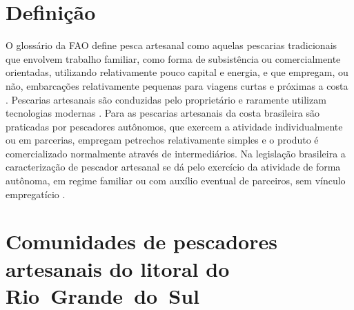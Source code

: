 \documentclass[a4paper,11pt,twoside,showtrims,onecolumn,openright,final]{memoir}
\begin{document}

\newpage

\section*{Definição}

O glossário da FAO define pesca artesanal como aquelas pescarias tradicionais que envolvem 
trabalho familiar, como forma de subsistência ou comercialmente orientadas, utilizando 
relativamente pouco capital e energia, e que empregam, ou não, embarcações relativamente 
pequenas para viagens curtas e próximas a costa \citep{fao2005}. Pescarias artesanais são conduzidas 
pelo proprietário e raramente utilizam tecnologias modernas \citep{panayotou1982}. 
Para \citet{diegues1983,diegues1988} as pescarias artesanais da costa 
brasileira são praticadas por pescadores autônomos, que exercem a atividade 
individualmente ou em parcerias, empregam petrechos relativamente simples e o produto 
é comercializado normalmente através de intermediários. Na legislação brasileira a 
caracterização de pescador artesanal se dá pelo exercício da atividade de forma autônoma, 
em regime familiar ou com auxílio eventual de parceiros, 
sem vínculo empregatício \citep{brasil2003,seap2004}.


\section*{Comunidades de pescadores artesanais do litoral do \mbox{Rio Grande do Sul}}



\end{document}
